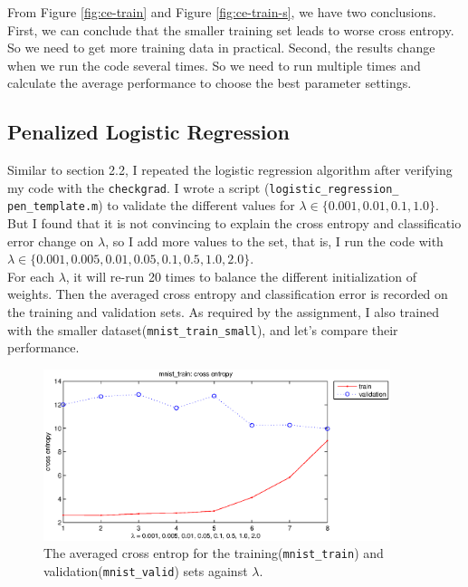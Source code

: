 \documentclass{article}
\begin{document}
From Figure \ref{fig:ce-train} and Figure \ref{fig:ce-train-s}, we have two conclusions. First, we can conclude that the smaller training set leads to worse cross entropy. So we need to get more training data in practical. Second, the results change when we run the code several times. So we need to run multiple times and calculate the average performance to choose the best parameter settings.\\

\subsection{Penalized Logistic Regression}

Similar to section 2.2, I repeated the logistic regression algorithm after verifying my code with the \texttt{checkgrad}. I wrote a script (\texttt{logistic\_regression\_ pen\_template.m}) to validate the different values for $\lambda \in \{0.001, 0.01, 0.1, 1.0\}$. But I found that it is not convincing to explain the cross entropy and classificatio error change on $\lambda$, so I add more values to the set, that is, I run the code with $\lambda \in \{0.001, 0.005, 0.01, 0.05, 0.1, 0.5, 1.0, 2.0\}$. \\

For each $\lambda$, it will re-run 20 times to balance the different initialization of weights. Then the averaged cross entropy and classification error is recorded on the training and validation sets. As required by the assignment, I also trained with the smaller dataset(\texttt{mnist\_train\_small}), and let's compare their performance.\\

\begin{figure}[htb]
\centering
\includegraphics[width=\textwidth,height=5cm]{2-3-train-ce.eps}
\caption{The averaged cross entrop for the training(\texttt{mnist\_train}) and validation(\texttt{mnist\_valid}) sets against $\lambda$.
\label{fig:2-3-train-ce}}
\end{figure}
\end{document}
